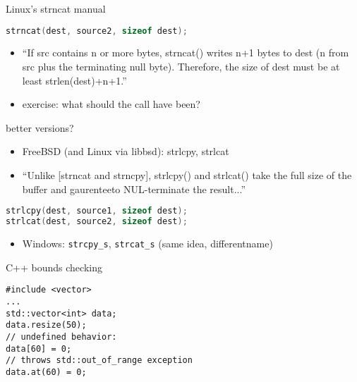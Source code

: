 \begin{frame}[fragile,label=strncatManual]{Linux's strncat manual}
\begin{lstlisting}[language=C,style=smaller]
strncat(dest, source2, sizeof dest);
\end{lstlisting}
\begin{itemize}
\item ``If src contains n or more bytes, strncat() writes n+1 bytes to  dest  (n
from  src  plus the terminating null byte).  Therefore, the size of dest
must be at least strlen(dest)+n+1.''
\end{itemize}
\begin{itemize}
\item exercise: what should the call have been?
\end{itemize}
\end{frame}

\begin{frame}[fragile,label=betterStrX]{better versions?}
\begin{itemize}
\item FreeBSD (and Linux via libbsd): strlcpy, strlcat
\item ``Unlike [strncat and strncpy], strlcpy() and strlcat() take the full size of the buffer
        and gaurenteeto NUL-terminate the result...''
\end{itemize}
\begin{lstlisting}[language=C++,style=smaller]
strlcpy(dest, source1, sizeof dest);
strlcat(dest, source2, sizeof dest);
\end{lstlisting}
\vspace{.5cm}
\begin{itemize}
\item Windows: \texttt{strcpy\_s}, \texttt{strcat\_s} (same idea, differentname)
\end{itemize}
\end{frame}

\begin{frame}[fragile,label=cppBounds]{C++ bounds checking}
\lstset{language=C,style=small}
\begin{lstlisting}
#include <vector>
...
std::vector<int> data;
data.resize(50);
// undefined behavior:
data[60] = 0;
// throws std::out_of_range exception
data.at(60) = 0;
\end{lstlisting}
\end{frame}

